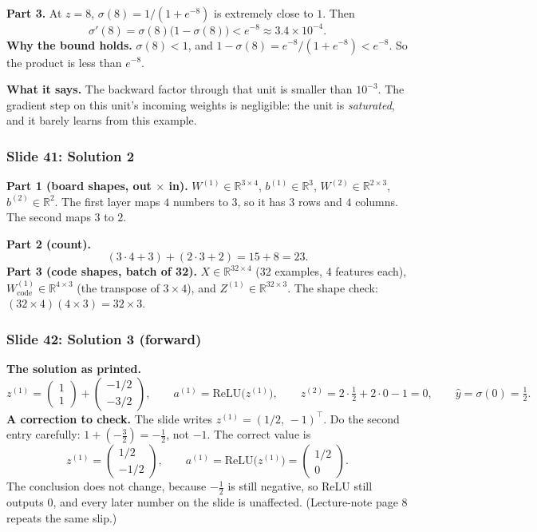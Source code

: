 \textbf{Part 3.} At $z=8$, $\sigma(8)=1/(1+e^{-8})$ is extremely close to $1$. Then
\[
\sigma'(8)=\sigma(8)\big(1-\sigma(8)\big)<e^{-8}\approx3.4\times10^{-4}.
\]
\textbf{Why the bound holds.} $\sigma(8)<1$, and $1-\sigma(8)=e^{-8}/(1+e^{-8})<e^{-8}$. So the product is less than $e^{-8}$.

\textbf{What it says.} The backward factor through that unit is smaller than $10^{-3}$. The gradient step on this unit's incoming weights is negligible: the unit is \emph{saturated}, and it barely learns from this example.

\subsubsection{Slide 41: Solution 2}

\textbf{Part 1 (board shapes, out $\times$ in).} $W^{(1)}\in\mathbb{R}^{3\times4}$, $b^{(1)}\in\mathbb{R}^{3}$, $W^{(2)}\in\mathbb{R}^{2\times3}$, $b^{(2)}\in\mathbb{R}^{2}$. The first layer maps $4$ numbers to $3$, so it has $3$ rows and $4$ columns. The second maps $3$ to $2$.

\textbf{Part 2 (count).}
\[
(3\cdot4+3)+(2\cdot3+2)=15+8=23.
\]
\textbf{Part 3 (code shapes, batch of 32).} $X\in\mathbb{R}^{32\times4}$ (32 examples, 4 features each), $W^{(1)}_{\text{code}}\in\mathbb{R}^{4\times3}$ (the transpose of $3\times4$), and $Z^{(1)}\in\mathbb{R}^{32\times3}$. The shape check: $(32\times4)(4\times3)=32\times3$.

\subsubsection{Slide 42: Solution 3 (forward)}

\textbf{The solution as printed.}
\[
z^{(1)}=\begin{pmatrix}1\\1\end{pmatrix}+\begin{pmatrix}-1/2\\-3/2\end{pmatrix},\qquad
a^{(1)}=\text{ReLU}\big(z^{(1)}\big),\qquad
z^{(2)}=2\cdot\tfrac12+2\cdot0-1=0,\qquad
\hat{y}=\sigma(0)=\tfrac12 .
\]
\textbf{A correction to check.} The slide writes $z^{(1)}=(1/2,\,-1)^\top$. Do the second entry carefully: $1+(-\tfrac32)=-\tfrac12$, not $-1$. The correct value is
\[
z^{(1)}=\begin{pmatrix}1/2\\-1/2\end{pmatrix}, \qquad a^{(1)}=\text{ReLU}\big(z^{(1)}\big)=\begin{pmatrix}1/2\\0\end{pmatrix}.
\]
The conclusion does not change, because $-\tfrac12$ is still negative, so ReLU still outputs $0$, and every later number on the slide is unaffected. (Lecture-note page 8 repeats the same slip.)

